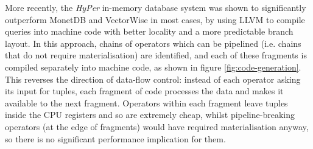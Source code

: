 More recently, the \emph{HyPer} in-memory database system \cite{Neumann:2011:ECE:2002938.2002940} was shown to significantly outperform MonetDB and VectorWise in most cases, by using LLVM to compile queries into machine code with better locality and a more predictable branch layout. In this approach, chains of operators which can be pipelined (i.e. chains that do not require materialisation) are identified, and each of these fragments is compiled separately into machine code, as shown in figure \ref{fig:code-generation}. This reverses the direction of data-flow control: instead of each operator asking its input for tuples, each fragment of code processes the data and makes it available to the next fragment. Operators within each fragment leave tuples inside the CPU registers and so are extremely cheap, whilst pipeline-breaking operators (at the edge of fragments) would have required materialisation anyway, so there is no significant performance implication for them.

